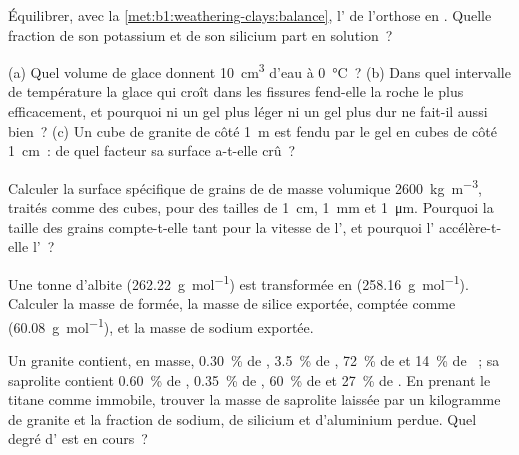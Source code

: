 \begin{exercise}[$\star$]\label{exo:b1:weathering-clays:3}
Équilibrer, avec la \cref{met:b1:weathering-clays:balance}, l' de
l'orthose  en . Quelle fraction de son potassium et de
son silicium part en solution~?
\end{exercise}

\begin{exercise}[$\star$]\label{exo:b1:weathering-clays:4}
(a) Quel volume de glace donnent \qty{10}{cm^3} d'eau à \qty{0}{\celsius}~?
(b) Dans quel intervalle de température la glace qui croît dans les fissures fend-elle la roche
le plus efficacement, et pourquoi ni un gel plus léger ni un gel plus dur ne fait-il aussi bien~?
(c) Un cube de granite de côté \qty{1}{m} est fendu par le gel en cubes de côté
\qty{1}{cm}~: de quel facteur sa surface a-t-elle crû~?
\end{exercise}

\begin{exercise}[$\star\star$]\label{exo:b1:weathering-clays:5}
Calculer la surface spécifique de grains de  de masse volumique
\qty{2600}{kg.m^{-3}}, traités comme des cubes, pour des tailles de \qty{1}{cm}, \qty{1}{mm}
et \qty{1}{\micro m}. Pourquoi la taille des grains compte-t-elle tant pour la vitesse de
l', et pourquoi l' accélère-t-elle l'~?
\end{exercise}

\begin{exercise}[$\star\star$]\label{exo:b1:weathering-clays:6}
Une tonne d'albite  (\qty{262.22}{g.mol^{-1}}) est transformée en
 (\qty{258.16}{g.mol^{-1}}). Calculer la masse de  formée, la
masse de silice exportée, comptée comme  (\qty{60.08}{g.mol^{-1}}), et la
masse de sodium exportée.
\end{exercise}

\begin{exercise}[$\star\star$]\label{exo:b1:weathering-clays:7}
Un granite contient, en masse, \qty{0.30}{\percent} de , \qty{3.5}{\percent}
de , \qty{72}{\percent} de  et \qty{14}{\percent} de ~; sa
saprolite contient \qty{0.60}{\percent} de , \qty{0.35}{\percent}
de , \qty{60}{\percent} de  et \qty{27}{\percent} de .
En prenant le titane comme immobile, trouver la masse de saprolite laissée par un kilogramme de
granite et la fraction de sodium, de silicium et d'aluminium perdue. Quel degré
d' est en cours~?
\end{exercise}

